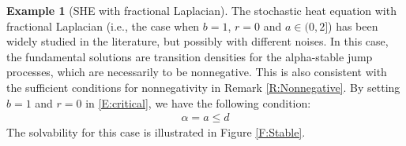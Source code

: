 \documentclass[12pt]{report}
\theoremstyle{plain}
\theoremstyle{definition}
\newtheorem{example}[theorem]{Example}
\numberwithin{equation}{section}
\begin{document}
\begin{example}[SHE with fractional Laplacian] \label{Eg:StableSHE}
	The stochastic heat equation with fractional Laplacian (i.e., the case when $b=1$, $r=0$ and $a\in
	(0,2]$) has been widely studied in the literature, but possibly with different noises. In this
	case, the fundamental solutions are transition densities for the alpha-stable jump processes,
	which are necessarily to be nonnegative. This is also consistent with the sufficient conditions
	for nonnegativity in Remark \ref{R:Nonnegative}. By setting $b=1$ and $r=0$ in \eqref{E:critical},
	we have the following condition:
	\begin{align*}
	\alpha = a \le d
	\end{align*}
	The solvability for this case is illustrated in Figure \ref{F:Stable}.
\end{example}
\end{document}
